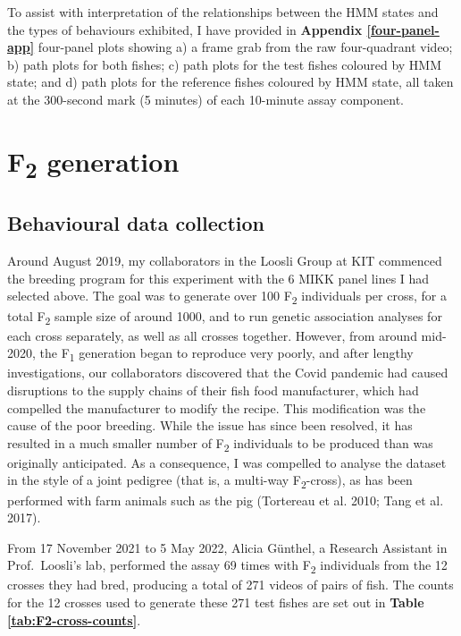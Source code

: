\documentclass[
]{book}
\begin{document}
To assist with interpretation of the relationships between the HMM states and the types of behaviours exhibited, I have provided in \textbf{Appendix \ref{four-panel-app}} four-panel plots showing a) a frame grab from the raw four-quadrant video; b) path plots for both fishes; c) path plots for the test fishes coloured by HMM state; and d) path plots for the reference fishes coloured by HMM state, all taken at the 300-second mark (5 minutes) of each 10-minute assay component.

\clearpage

\hypertarget{f2-generation}{%
\section{\texorpdfstring{F\textsubscript{2} generation}{F2 generation}}\label{f2-generation}}

\hypertarget{behavioural-data-collection}{%
\subsection{Behavioural data collection}\label{behavioural-data-collection}}

Around August 2019, my collaborators in the Loosli Group at KIT commenced the breeding program for this experiment with the 6 MIKK panel lines I had selected above. The goal was to generate over 100 F\textsubscript{2} individuals per cross, for a total F\textsubscript{2} sample size of around 1000, and to run genetic association analyses for each cross separately, as well as all crosses together. However, from around mid-2020, the F\textsubscript{1} generation began to reproduce very poorly, and after lengthy investigations, our collaborators discovered that the Covid pandemic had caused disruptions to the supply chains of their fish food manufacturer, which had compelled the manufacturer to modify the recipe. This modification was the cause of the poor breeding. While the issue has since been resolved, it has resulted in a much smaller number of F\textsubscript{2} individuals to be produced than was originally anticipated. As a consequence, I was compelled to analyse the dataset in the style of a joint pedigree (that is, a multi-way F\textsubscript{2}-cross), as has been performed with farm animals such as the pig (Tortereau et al. 2010; Tang et al. 2017).

From 17 November 2021 to 5 May 2022, Alicia Günthel, a Research Assistant in Prof.~Loosli's lab, performed the assay 69 times with F\textsubscript{2} individuals from the 12 crosses they had bred, producing a total of 271 videos of pairs of fish. The counts for the 12 crosses used to generate these 271 test fishes are set out in \textbf{Table \ref{tab:F2-cross-counts}}.
\end{document}
